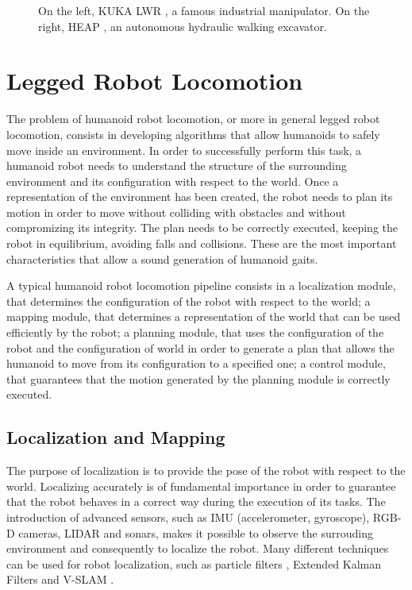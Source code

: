 \begin{figure}
\begin{subfigure}[b]{0.6\textwidth}
    \caption{}
    \label{fig:ethz-heap-excavator}
  \end{subfigure}
  \caption{On the left, KUKA LWR \cite{Gaz2014KUKALWR}, a famous industrial
      manipulator. On the right, HEAP \cite{Hutter2015WalkingExcavators},
      an autonomous hydraulic walking excavator.}
\end{figure}


\section{Legged Robot Locomotion}
The problem of humanoid robot locomotion, or more in general legged robot 
locomotion, consists in developing algorithms that allow humanoids to 
safely move inside an environment. In order to successfully perform this task,
a humanoid robot needs to understand the structure of the
surrounding environment and its configuration with respect to the world.
Once a representation of the 
environment has been created, the robot needs to plan its motion in order to
move without colliding with obstacles and without compromizing its integrity.
The plan needs to be correctly executed, keeping the robot in equilibrium,
avoiding falls and collisions. These are the most important characteristics
that allow a sound generation of humanoid gaits.

A typical humanoid robot locomotion pipeline consists in a localization module,
that determines the configuration of the robot with respect to the world; a 
mapping module, that determines a representation of the world that can be used 
efficiently by the robot; a planning module, that uses the configuration of 
the robot and the configuration of world in order to generate a plan that 
allows the humanoid to move from its configuration to a specified one;
a control module, that guarantees that the motion generated by the planning
module is correctly executed.

\subsection{Localization and Mapping}
The purpose of localization is to provide the pose of the robot with respect
to the world. Localizing accurately is of fundamental importance in order to
guarantee that the robot behaves in a correct way during the execution of its
tasks. The introduction of advanced sensors, such as IMU (accelerometer,
gyroscope), RGB-D cameras, LIDAR and sonars, makes it possible to observe
the surrouding environment and consequently to localize the robot. Many
different techniques can be used for robot localization, such as
particle filters \cite{Hornung2010HumanoidRobotLocalization}, Extended
Kalman Filters \cite{Oriolo2015HumanoidOdometricLocalization} and V-SLAM
\cite{Tanguy2019MPCWithDenseVisualSLAM}.


